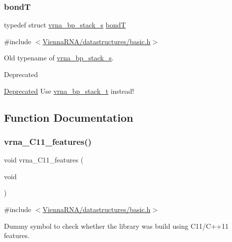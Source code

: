 \subsubsection{\texorpdfstring{bondT}{bondT}}
{\footnotesize\ttfamily typedef struct \hyperlink{group__data__structures_structvrna__bp__stack__s}{vrna\+\_\+bp\+\_\+stack\+\_\+s} \hyperlink{group__data__structures_gaaeed53a7508c6ce549a98223e94b25df}{bondT}}



{\ttfamily \#include $<$\hyperlink{datastructures_2basic_8h}{Vienna\+R\+N\+A/datastructures/basic.\+h}$>$}



Old typename of \hyperlink{group__data__structures_structvrna__bp__stack__s}{vrna\+\_\+bp\+\_\+stack\+\_\+s}. 

\begin{DoxyRefDesc}{Deprecated}
\item[\hyperlink{deprecated__deprecated000201}{Deprecated}]Use \hyperlink{group__data__structures_gaa651bda42e7692f08cb603cd6834b0ee}{vrna\+\_\+bp\+\_\+stack\+\_\+t} instead! \end{DoxyRefDesc}


\subsection{Function Documentation}
\mbox{\label{group__data__structures_ga21744ae2d6a17309f9327d3547cef0cb}} 
\subsubsection{\texorpdfstring{vrna\+\_\+\+C11\+\_\+features()}{vrna\_C11\_features()}}
{\footnotesize\ttfamily void vrna\+\_\+\+C11\+\_\+features (\begin{DoxyParamCaption}\item[{void}]{ }\end{DoxyParamCaption})}



{\ttfamily \#include $<$\hyperlink{datastructures_2basic_8h}{Vienna\+R\+N\+A/datastructures/basic.\+h}$>$}



Dummy symbol to check whether the library was build using C11/\+C++11 features. 

